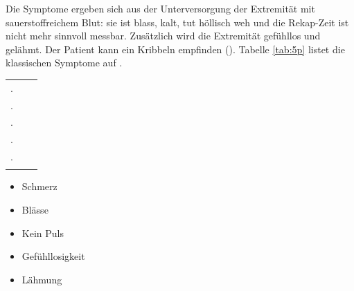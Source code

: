 {%
Die Symptome ergeben sich aus der Unterversorgung der
Extremität mit sauerstoffreichem Blut: sie ist blass,
kalt, tut höllisch weh und die Rekap-Zeit ist nicht
mehr sinnvoll messbar. Zusätzlich wird die Extremität
gefühllos und gelähmt. Der Patient kann ein Kribbeln
empfinden (). Tabelle \ref{tab:5p}
listet die klassischen Symptome auf .


\begin{tabulary}{\linewidth}{CLL}
\midrule\addlinespace
{}. & \noindent{}        & \noindent{}
\\
. & \noindent{}        & \noindent{}
\\
. & \noindent{}    & \noindent{}
\\
. & \noindent{} & \noindent{}
\\
. & \noindent{}   & \noindent{}
\\\addlinespace\bottomrule
\end{tabulary}
}{%
\begin{itemize}
  \item Schmerz
  \item Blässe
  \item Kein Puls
  \item Gefühllosigkeit
  \item Lähmung
\end{itemize}
}{}{}{}



% 

